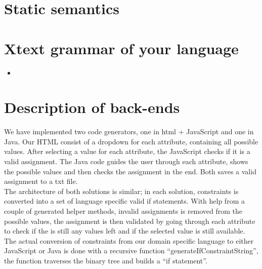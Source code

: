 \documentclass[paper=a4, fontsize=11pt]{scrartcl} %
\numberwithin{equation}{section} %
\numberwithin{figure}{section} %
\numberwithin{table}{section} %
\newcommand{\java}[2]{
\begin{itemize}
\item[]
\end{itemize}
}
\begin{document}
\section{Static semantics}

\section{Xtext grammar of your language}
\java{../configproject/xtext/org.xtext.example.smdpdsl/src/org/xtext/example/mydsl/SmdpDsl.xtext}{static}

\section{Description of back-ends}
We have implemented two code generators, one in html + JavaScript and one in Java. Our HTML consist of a dropdown for each attribute, containing all possible values. After selecting a value for each attribute, the JavaScript checks if it is a valid assignment. The Java code guides the user through each attribute, shows the possible values and then checks the assignment in the end. Both saves a valid assignment to a txt file.\\

The architecture of both solutions is similar; in each solution, constraints is converted into a set of language specific valid if statements. With help from a couple of generated helper methods, invalid assignments is removed from the possible values, the assignment is then validated by going through each attribute to check if the is still any values left and if the selected value is still available.\\
The actual conversion of constraints from our domain specific language to either JavaScript or Java is done with a recursive function “generateIfConstraintString”, the function traverses the binary tree and builds a “if statement”. 
\end{document}
